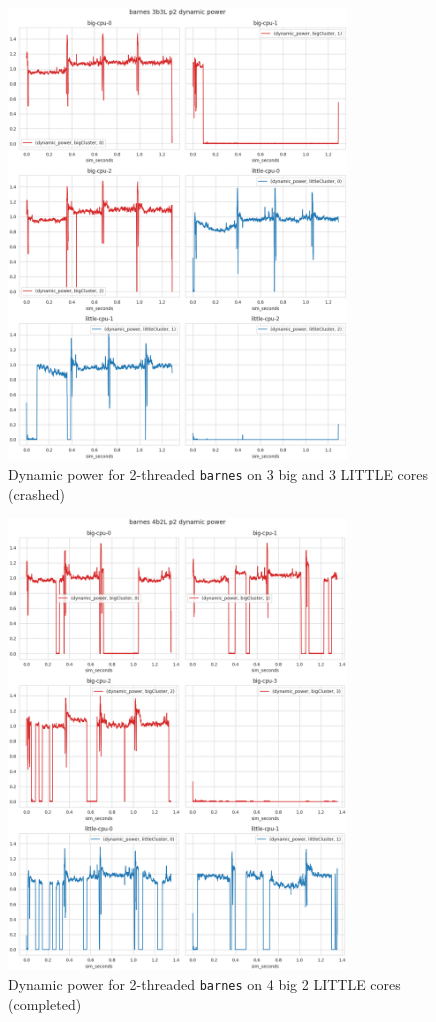 \begin{figure}[H]
    \centering
    \includegraphics[width=0.8\textwidth]{roi-plots/barnes/3b3L/p2-fail-dyn-pow.png}
    \caption{Dynamic power for 2-threaded \texttt{barnes} on 3 big and 3 LITTLE 
             cores (crashed)}
\end{figure}

\begin{figure}[H]
    \centering
    \includegraphics[width=0.8\textwidth]{roi-plots/barnes/4b2L/p2-success-dyn-pow.png}
    \caption{Dynamic power for 2-threaded \texttt{barnes} on 4 big 2 LITTLE
             cores (completed)}
\end{figure}

